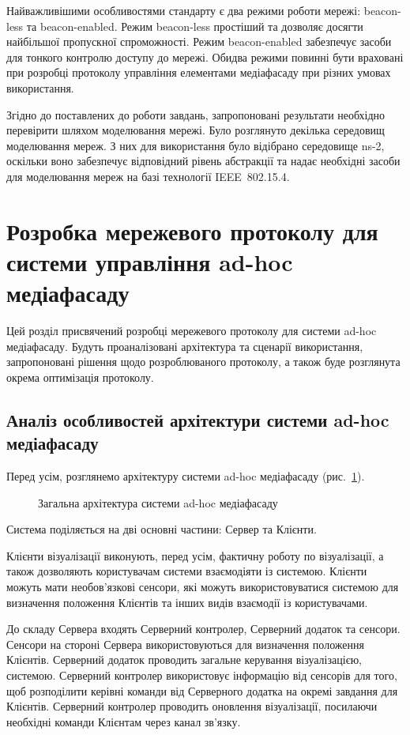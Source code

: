 \documentclass[a4paper,ukrainian,utf8,nocolumnsxix,nocolumnxxxii,nocolumnxxxi,floatsection,equationsection]{eskdtext}
\newcommand{\figref}[1]{рис.~\ref{#1}}
\newcommand{\iee}[0]{IEEE~802.15.4\xspace}
\newcommand{\blm}[0]{beacon-less\xspace}
\newcommand{\bem}[0]{beacon-enabled\xspace}
\begin{document}
Найважливішими особливостями стандарту є два режими роботи мережі: \blm та \bem. Режим \blm простіший та дозволяє досягти найбільшої пропускної спроможності. Режим \bem забезпечує засоби для тонкого контролю доступу до мережі. Обидва режими повинні бути враховані при розробці протоколу управління елементами медіафасаду при різних умовах використання.

Згідно до поставлених до роботи завдань, запропоновані результати необхідно перевірити шляхом моделювання мережі. Було розглянуто декілька середовищ моделювання мереж. З них для використання було відібрано середовище ns-2, оскільки воно забезпечує відповідний рівень абстракції та надає необхідні засоби для моделювання мереж на базі технології \iee.


\section{Розробка мережевого протоколу для системи управління ad-hoc медіафасаду}
\label{sec:2:network:protocol:amf}


Цей розділ присвячений розробці мережевого протоколу для системи ad-hoc медіафасаду. Будуть проаналізовані архітектура та сценарії використання, запропоновані рішення щодо розроблюваного протоколу, а також буде розглянута окрема оптимізація протоколу.

\subsection{Аналіз особливостей архітектури системи ad-hoc медіафасаду}
\label{sub:system:arch}

Перед усім, розглянемо архітектуру системи ad-hoc медіафасаду (\figref{fig:sys_arch}). 

\begin{figure}[bth]
\centering
{}
\caption{\label{fig:sys_arch}Загальна архітектура системи ad-hoc медіафасаду}
\end{figure}

Система поділяється на дві основні частини: Сервер та Клієнти.

Клієнти візуалізації виконують, перед усім, фактичну роботу по візуалізації, а також дозволяють користувачам системи взаємодіяти із системою. Клієнти можуть мати необов'язкові сенсори, які можуть використовуватися системою для визначення положення Клієнтів та інших видів взаємодії із користувачами.

До складу Сервера входять Серверний контролер, Серверний додаток та сенсори. Сенсори на стороні Сервера використовуються для визначення положення Клієнтів. Серверний додаток проводить загальне керування візуалізацією, системою. Серверний контролер використовує інформацію від сенсорів для того, щоб розподілити керівні команди від Серверного додатка на окремі завдання для Клієнтів. Серверний контролер проводить оновлення візуалізації, посилаючи необхідні команди Клієнтам через канал зв'язку.
\end{document}
